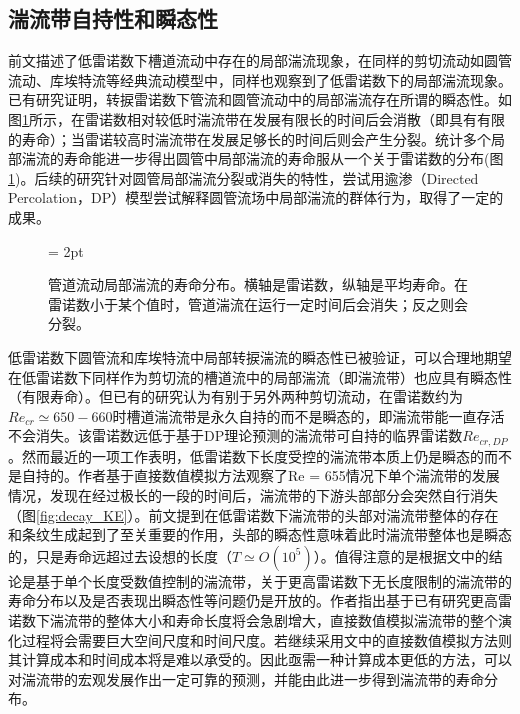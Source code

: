 \subsection{湍流带自持性和瞬态性}
前文描述了低雷诺数下槽道流动中存在的局部湍流现象，在同样的剪切流动如圆管流动、库埃特流等经典流动模型中，同样也观察到了低雷诺数下的局部湍流现象\cite{Hof2006FiniteLO,Barkley2016}。已有研究证明，转捩雷诺数下管流和圆管流动中的局部湍流存在所谓的瞬态性\cite{Barkley2016}。如图\ref{fig:lifetime}所示，在雷诺数相对较低时湍流带在发展有限长的时间后会消散（即具有有限的寿命）；当雷诺较高时湍流带在发展足够长的时间后则会产生分裂。统计多个局部湍流的寿命能进一步得出圆管中局部湍流的寿命服从一个关于雷诺数的分布(图\ref{fig:lifetime})\cite{Sabine1998}。后续的研究\cite{Barkley2016,POMEAU19863,Lemoult2016DirectedPP}针对圆管局部湍流分裂或消失的特性，尝试用逾渗（Directed Percolation，DP）模型尝试解释圆管流场中局部湍流的群体行为，取得了一定的成果。

\begin{figure}[H]
	\subfigbottomskip = 2pt
	\begin{minipage}[h]{\linewidth}
	\centering
	\end{minipage}
	\quad
	\caption{管道流动局部湍流的寿命分布\cite{Barkley2016}。横轴是雷诺数，纵轴是平均寿命。在雷诺数小于某个值时，管道湍流在运行一定时间后会消失；反之则会分裂。}
\label{fig:lifetime}
\end{figure}

低雷诺数下圆管流和库埃特流中局部转捩湍流的瞬态性已被验证，可以合理地期望在低雷诺数下同样作为剪切流的槽道流中的局部湍流（即湍流带）也应具有瞬态性（有限寿命）。但已有的研究认为有别于另外两种剪切流动，在雷诺数约为$Re_{cr} \simeq 650-660$时槽道湍流带是永久自持的而不是瞬态的，即湍流带能一直存活不会消失\cite{Kanazawa2018,Tao2018,Paranjape2019}。该雷诺数远低于基于DP理论预测的湍流带可自持的临界雷诺数$Re_{cr,DP}$\cite{Sano2016}。然而最近的一项工作表明，低雷诺数下长度受控的湍流带本质上仍是瞬态的而不是自持的\cite{xu_song_2022}。作者基于直接数值模拟方法观察了Re = 655情况下单个湍流带的发展情况，发现在经过极长的一段的时间后，湍流带的下游头部部分会突然自行消失（图\ref{fig:decay_KE}）。前文提到在低雷诺数下湍流带的头部对湍流带整体的存在和条纹生成起到了至关重要的作用，头部的瞬态性意味着此时湍流带整体也是瞬态的，只是寿命远超过去设想的长度（$T \simeq O(10^5)$）。值得注意的是根据文中的结论是基于单个长度受数值控制的湍流带，关于更高雷诺数下无长度限制的湍流带的寿命分布以及是否表现出瞬态性等问题仍是开放的。作者指出基于已有研究更高雷诺数下湍流带的整体大小和寿命长度将会急剧增大，直接数值模拟湍流带的整个演化过程将会需要巨大空间尺度和时间尺度。若继续采用文中的直接数值模拟方法则其计算成本和时间成本将是难以承受的。因此亟需一种计算成本更低的方法，可以对湍流带的宏观发展作出一定可靠的预测，并能由此进一步得到湍流带的寿命分布。

